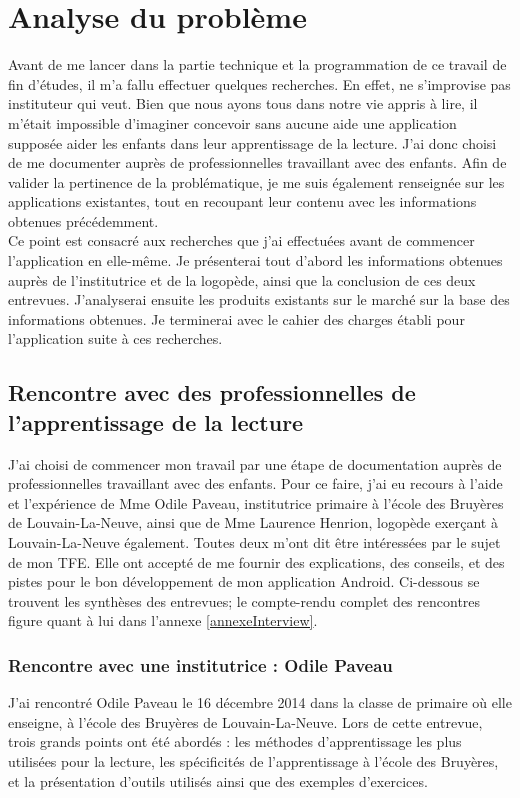 \section{Analyse du problème}
Avant de me lancer dans la partie technique et la programmation de ce travail de fin d'études, il m'a fallu effectuer quelques recherches. En effet, ne s'improvise pas instituteur qui veut. Bien que nous ayons tous dans notre vie appris à lire, il m'était impossible d'imaginer concevoir sans aucune aide une application supposée aider les enfants dans leur apprentissage de la lecture. J'ai donc choisi de me documenter auprès de professionnelles travaillant avec des enfants. Afin de valider la pertinence de la problématique, je me suis également renseignée sur les applications existantes, tout en recoupant leur contenu avec les informations obtenues précédemment.\\

Ce point est consacré aux recherches que j'ai effectuées avant de commencer l'application en elle-même. Je présenterai tout d'abord les informations obtenues auprès de l'institutrice et de la logopède, ainsi que la conclusion de ces deux entrevues. J'analyserai ensuite les produits existants sur le marché sur la base des informations obtenues. Je terminerai avec le cahier des charges établi pour l'application suite à ces recherches.

\subsection{Rencontre avec des professionnelles de l'apprentissage de la lecture}
J'ai choisi de commencer mon travail par une étape de documentation auprès de professionnelles travaillant avec des enfants. Pour ce faire, j'ai eu recours à l'aide et l'expérience de Mme Odile Paveau, institutrice primaire à l'école des Bruyères de Louvain-La-Neuve, ainsi que de Mme Laurence Henrion, logopède exerçant à Louvain-La-Neuve également. Toutes deux m'ont dit être intéressées par le sujet de mon TFE. Elle ont accepté de me fournir des explications, des conseils, et des pistes pour le bon développement de mon application Android. Ci-dessous se trouvent les synthèses des entrevues; le compte-rendu complet des rencontres figure quant à lui dans l'annexe \ref{annexeInterview}.

\subsubsection{Rencontre avec une institutrice : Odile Paveau\label{Freinet}}
J'ai rencontré Odile Paveau le 16 décembre 2014 dans la classe de primaire où elle enseigne, à l'école des Bruyères de Louvain-La-Neuve. Lors de cette entrevue, trois grands points ont été abordés : les méthodes d'apprentissage les plus utilisées pour la lecture, les spécificités de l'apprentissage à l'école des Bruyères, et la présentation d'outils utilisés ainsi que des exemples d'exercices.\\

